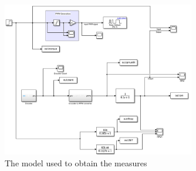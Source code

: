 \documentclass[11pt, onecolumn]{article}
\begin{document}
\begin{figure}[h!]
    \centering
    \includegraphics[width=0.75\textwidth]{q1-model.png}
    \caption{The model used to obtain the measures}
    \label{fig:q1-model}
\end{figure}
\end{document}
